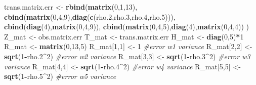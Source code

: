 \documentclass[]{article}
\newenvironment{Shaded}{\begin{snugshade}}{\end{snugshade}}
\newcommand{\KeywordTok}[1]{\textcolor[rgb]{0.13,0.29,0.53}{\textbf{#1}}}
\newcommand{\DecValTok}[1]{\textcolor[rgb]{0.00,0.00,0.81}{#1}}
\newcommand{\StringTok}[1]{\textcolor[rgb]{0.31,0.60,0.02}{#1}}
\newcommand{\CommentTok}[1]{\textcolor[rgb]{0.56,0.35,0.01}{\textit{#1}}}
\newcommand{\OperatorTok}[1]{\textcolor[rgb]{0.81,0.36,0.00}{\textbf{#1}}}
\newcommand{\NormalTok}[1]{#1}
\begin{document}
\begin{Shaded}
\begin{Highlighting}[]
\NormalTok{  trans.matrix.err <-}\StringTok{ }\KeywordTok{rbind}\NormalTok{(}\KeywordTok{matrix}\NormalTok{(}\DecValTok{0}\NormalTok{,}\DecValTok{1}\NormalTok{,}\DecValTok{13}\NormalTok{),}
          \KeywordTok{cbind}\NormalTok{(}\KeywordTok{matrix}\NormalTok{(}\DecValTok{0}\NormalTok{,}\DecValTok{4}\NormalTok{,}\DecValTok{9}\NormalTok{),}\KeywordTok{diag}\NormalTok{(}\KeywordTok{c}\NormalTok{(rho.}\DecValTok{2}\NormalTok{,rho.}\DecValTok{3}\NormalTok{,rho.}\DecValTok{4}\NormalTok{,rho.}\DecValTok{5}\NormalTok{))),}
          \KeywordTok{cbind}\NormalTok{(}\KeywordTok{diag}\NormalTok{(}\DecValTok{4}\NormalTok{),}\KeywordTok{matrix}\NormalTok{(}\DecValTok{0}\NormalTok{,}\DecValTok{4}\NormalTok{,}\DecValTok{9}\NormalTok{)),}
          \KeywordTok{cbind}\NormalTok{(}\KeywordTok{matrix}\NormalTok{(}\DecValTok{0}\NormalTok{,}\DecValTok{4}\NormalTok{,}\DecValTok{5}\NormalTok{),}\KeywordTok{diag}\NormalTok{(}\DecValTok{4}\NormalTok{),}\KeywordTok{matrix}\NormalTok{(}\DecValTok{0}\NormalTok{,}\DecValTok{4}\NormalTok{,}\DecValTok{4}\NormalTok{))}
\NormalTok{    )}
\NormalTok{Z_mat <-}\StringTok{ }\NormalTok{obs.matrix.err}
\NormalTok{T_mat <-}\StringTok{ }\NormalTok{trans.matrix.err}
\NormalTok{H_mat <-}\StringTok{ }\KeywordTok{diag}\NormalTok{(}\DecValTok{0}\NormalTok{,}\DecValTok{5}\NormalTok{)}\OperatorTok{*}\DecValTok{1}
\NormalTok{R_mat <-}\StringTok{ }\KeywordTok{matrix}\NormalTok{(}\DecValTok{0}\NormalTok{,}\DecValTok{13}\NormalTok{,}\DecValTok{5}\NormalTok{)}
\NormalTok{R_mat[}\DecValTok{1}\NormalTok{,}\DecValTok{1}\NormalTok{] <-}\StringTok{ }\DecValTok{1}  \CommentTok{#error w1 variance}
\NormalTok{R_mat[}\DecValTok{2}\NormalTok{,}\DecValTok{2}\NormalTok{] <-}\StringTok{ }\KeywordTok{sqrt}\NormalTok{(}\DecValTok{1}\OperatorTok{-}\NormalTok{rho.}\DecValTok{2}\OperatorTok{^}\DecValTok{2}\NormalTok{)  }\CommentTok{#error w2 variance}
\NormalTok{R_mat[}\DecValTok{3}\NormalTok{,}\DecValTok{3}\NormalTok{] <-}\StringTok{ }\KeywordTok{sqrt}\NormalTok{(}\DecValTok{1}\OperatorTok{-}\NormalTok{rho.}\DecValTok{3}\OperatorTok{^}\DecValTok{2}\NormalTok{)  }\CommentTok{#error w3 variance}
\NormalTok{R_mat[}\DecValTok{4}\NormalTok{,}\DecValTok{4}\NormalTok{] <-}\StringTok{ }\KeywordTok{sqrt}\NormalTok{(}\DecValTok{1}\OperatorTok{-}\NormalTok{rho.}\DecValTok{4}\OperatorTok{^}\DecValTok{2}\NormalTok{)  }\CommentTok{#error w4 variance}
\NormalTok{R_mat[}\DecValTok{5}\NormalTok{,}\DecValTok{5}\NormalTok{] <-}\StringTok{ }\KeywordTok{sqrt}\NormalTok{(}\DecValTok{1}\OperatorTok{-}\NormalTok{rho.}\DecValTok{5}\OperatorTok{^}\DecValTok{2}\NormalTok{)  }\CommentTok{#error w5 variance }


\end{Highlighting}
\end{Shaded}
\end{document}
